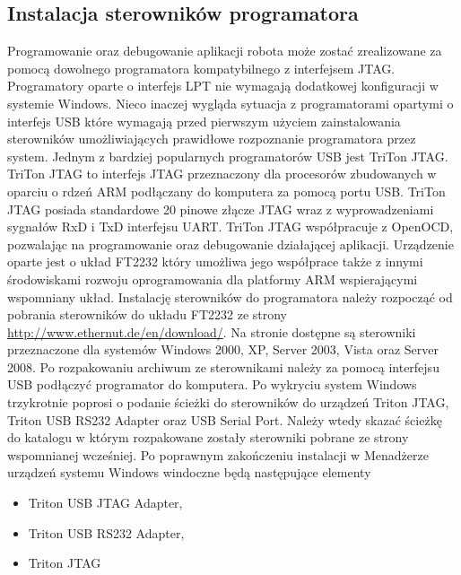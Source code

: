 \subsection{Instalacja sterowników programatora}
Programowanie oraz debugowanie aplikacji robota może zostać zrealizowane za
pomocą dowolnego programatora kompatybilnego z interfejsem JTAG. Programatory
oparte o interfejs LPT nie wymagają dodatkowej konfiguracji w systemie Windows.
Nieco inaczej wygląda sytuacja z programatorami opartymi o interfejs USB które
wymagają przed pierwszym użyciem zainstalowania sterowników umożliwiających
prawidłowe rozpoznanie programatora przez system. Jednym z bardziej popularnych
programatorów USB jest TriTon JTAG. TriTon JTAG to interfejs JTAG przeznaczony
dla procesorów zbudowanych w oparciu o rdzeń ARM podłączany do komputera za
pomocą portu USB. TriTon JTAG posiada standardowe 20 pinowe złącze JTAG wraz z
wyprowadzeniami sygnałów RxD i TxD interfejsu UART. TriTon JTAG współpracuje z
OpenOCD, pozwalając na programowanie oraz debugowanie działającej aplikacji.
Urządzenie oparte jest o układ FT2232 który umożliwa jego współprace także z
innymi środowiskami rozwoju oprogramowania dla platformy ARM wspierającymi
wspomniany układ. \newline \newline Instalację sterowników do programatora należy
rozpocząć od pobrania sterowników do układu FT2232 ze strony
\url{http://www.ethernut.de/en/download/}. Na stronie dostępne są sterowniki
przeznaczone dla systemów Windows 2000, XP, Server 2003, Vista oraz Server 2008.
Po rozpakowaniu archiwum ze sterownikami należy za pomocą interfejsu USB
podłączyć programator do komputera. Po wykryciu system Windows trzykrotnie
poprosi o podanie ścieżki do sterowników do urządzeń Triton JTAG, Triton USB
RS232 Adapter oraz USB Serial Port. Należy wtedy skazać ścieżkę do katalogu w
którym rozpakowane zostały sterowniki pobrane ze strony wspomnianej wcześniej.
Po poprawnym zakończeniu instalacji w Menadżerze urządzeń systemu Windows
windoczne będą następujące elementy
\begin{itemize}
  \item Triton USB JTAG Adapter,
  \item Triton USB RS232 Adapter,
  \item Triton JTAG
\end{itemize}
